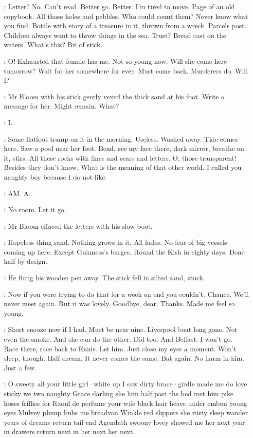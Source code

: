 \Bloom:
Letter?
No.
Can't read.
Better go.
Better.
I'm tired to move.
Page of an old copybook.
All those holes and pebbles.
Who could count them?
Never know what you find.
Bottle with story of a treasure in it,
thrown from a wreck.
Parcels post.
Children always want to throw things in the sea.
Trust?
Bread cast on the waters.
What's this?
Bit of stick.

\Bloom:
O!
Exhausted that female has me.
Not so young now.
Will she come here tomorrow?
Wait for her somewhere for ever.
Must come back.
Murderers do.
Will I?

:
Mr Bloom
with his stick
gently vexed the thick sand at his foot.
Write a message for her.
Might remain.
What?

\Bloom:
I.

\Bloom:
Some flatfoot tramp on it in the morning.
Useless.
Washed away.
Tide comes here.
Saw a pool near her foot.
Bend,
see my face there,
dark mirror,
breathe on it,
stirs.
All these rocks
with lines and scars and letters.
O,
those transparent!
Besides
they don't know.
What is the meaning of that other world.
I called you naughty boy
because I do not like.

\Bloom:
AM.
A.

\Bloom:
No room.
Let it go.

:
Mr Bloom effaced the letters
with his slow boot.

\Bloom:
Hopeless thing
sand.
Nothing grows in it.
All fades.
No fear of big vessels coming up here.
Except Guinness's barges.
Round the Kish in eighty days.
Done half by design.

:
He flung his wooden pen away.
The stick fell in silted sand,
stuck.

\Bloom:
Now
if you were trying to do that for a week on end
you couldn't.
Chance.
We'll never meet again.
But it was lovely.
Goodbye,
dear.
Thanks.
Made me feel so young.

\Bloom:
Short snooze now
if I had.
Must be near nine.
Liverpool boat
long gone.
Not even the smoke.
And she can do the other.
Did too.
And Belfast.
I won't go.
Race there,
race back to Ennis.
Let him.
Just close my eyes
a moment.
Won't sleep,
though.
Half dream.
It never comes the same.
Bat again.
No harm in him.
Just a few.

\Bloom:
O sweety
all your little girl·white
up I saw dirty brace·girdle
made me do
love sticky
we two naughty
Grace darling
she him
half past the bed
met him pike hoses
frillies for Raoul
de perfume
your wife
black hair
heave under embon
 young eyes
Mulvey
plump bubs
me breadvan Winkle
red slippers
she rusty sleep
wander years
of dreams
return tail end
Agendath
swoony lovey
showed me her
next year
in drawers
return
next in her
next her
next.

